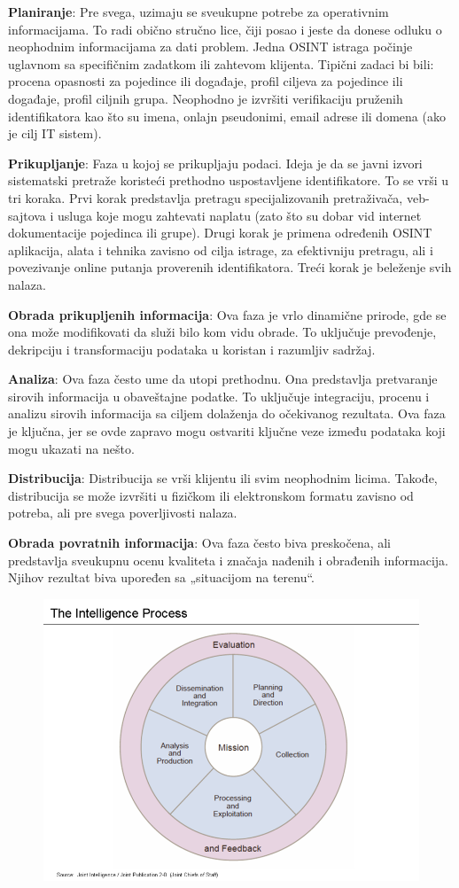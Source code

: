 \documentclass[fleqn, 12pt]{article}
\begin{document}
{\bf Planiranje}: Pre svega, uzimaju se sveukupne potrebe za operativnim informacijama. To radi obično stručno lice, čiji posao i jeste da donese odluku o neophodnim informacijama za dati problem. Jedna OSINT istraga počinje uglavnom sa specifičnim zadatkom ili zahtevom klijenta. Tipični zadaci bi bili: procena opasnosti za pojedince ili događaje, profil ciljeva za pojedince ili događaje, profil ciljnih grupa. Neophodno je izvršiti verifikaciju pruženih identifikatora kao što su imena, onlajn pseudonimi, email adrese ili domena (ako je cilj IT sistem).\newline

{\bf Prikupljanje}: Faza u kojoj se prikupljaju podaci. Ideja je da se javni izvori sistematski pretraže koristeći prethodno uspostavljene identifikatore. To se vrši u tri koraka. Prvi korak predstavlja pretragu specijalizovanih pretraživača, veb-sajtova i usluga koje mogu zahtevati naplatu (zato što su dobar vid internet dokumentacije pojedinca ili grupe). Drugi korak je primena određenih OSINT aplikacija, alata i tehnika zavisno od cilja istrage, za efektivniju pretragu, ali i povezivanje online putanja proverenih identifikatora. Treći korak je beleženje svih nalaza.\newline

{\bf Obrada prikupljenih informacija}: Ova faza je vrlo dinamične prirode, gde se ona može modifikovati da služi bilo kom vidu obrade. To uključuje prevođenje, dekripciju i transformaciju podataka u koristan i razumljiv sadržaj.\newline

{\bf Analiza}: Ova faza često ume da utopi prethodnu. Ona predstavlja pretvaranje sirovih informacija u obaveštajne podatke. To uključuje integraciju, procenu i analizu sirovih informacija sa ciljem dolaženja do očekivanog rezultata. Ova faza je ključna, jer se ovde zapravo mogu ostvariti ključne veze između podataka koji mogu ukazati na nešto.\newline

{\bf Distribucija}: Distribucija se vrši klijentu ili svim neophodnim licima. Takođe, distribucija se može izvršiti u fizičkom ili elektronskom formatu zavisno od potreba, ali pre svega poverljivosti nalaza.\newline

{\bf Obrada povratnih informacija}: Ova faza često biva preskočena, ali predstavlja sveukupnu ocenu kvaliteta i značaja nađenih i obrađenih informacija. Njihov rezultat biva upoređen sa „situacijom na terenu“.
\begin{figure}[!h]
    \centering
    \includegraphics[width=0.5\linewidth]{800px-The_Intelligence_Process_JP_2-0.png}
\end{figure}
\end{document}
